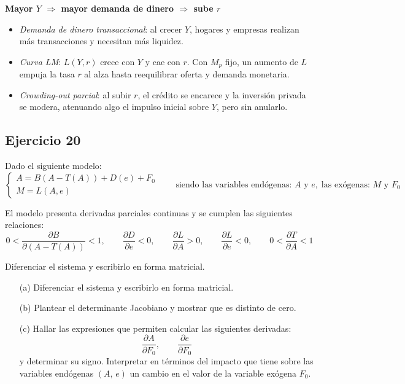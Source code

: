 \documentclass{article}
\begin{document}
\bigskip

\noindent
\textbf{\color{teal}Mayor \(Y\) \(\Rightarrow\) mayor demanda de dinero \(\Rightarrow\) sube \(r\)}

\begin{itemize}
  \item \emph{\color{teal}Demanda de dinero transaccional}: al crecer \(Y\), hogares y empresas realizan más transacciones y necesitan más liquidez.
  \item \emph{\color{teal}Curva LM}: \(L(Y,r)\) crece con \(Y\) y cae con \(r\). Con \(M_p\) fijo, un aumento de \(L\) empuja la tasa \(r\) al alza hasta reequilibrar oferta y demanda monetaria.
  \item \emph{\color{teal}Crowding-out parcial}: al subir \(r\), el crédito se encarece y la inversión privada se modera, atenuando algo el impulso inicial sobre \(Y\), pero sin anularlo.
\end{itemize}


\newpage
\subsection{Ejercicio 20}



Dado el siguiente modelo:
\[
\begin{cases}
A = B(A - T(A)) + D(e) + F_0\\[6pt]
M = L(A,e)
\end{cases}
\qquad \text{siendo las variables endógenas: } A \text{ y } e,\;
\text{las exógenas: } M \text{ y } F_0
\]

El modelo presenta derivadas parciales continuas y se cumplen las siguientes relaciones:
\[
0 < \frac{\partial B}{\partial (A - T(A))} < 1,
\qquad
\frac{\partial D}{\partial e} < 0,
\qquad
\frac{\partial L}{\partial A} > 0,
\qquad
\frac{\partial L}{\partial e} < 0,
\qquad
0 < \frac{\partial T}{\partial A} < 1
\]

\medskip

\noindent
Diferenciar el sistema y escribirlo en forma matricial.

\begin{itemize}
  \item[(a)] Diferenciar el sistema y escribirlo en forma matricial.
  \item[(b)] Plantear el determinante Jacobiano y mostrar que es distinto de cero.
  \item[(c)] Hallar las expresiones que permiten calcular las siguientes derivadas:
  \[
  \frac{\partial A}{\partial F_0},
  \qquad
  \frac{\partial e}{\partial F_0}
  \]
  y determinar su signo. Interpretar en términos del impacto que tiene sobre las variables endógenas \((A,\,e)\) un cambio en el valor de la variable exógena \(F_0\).
\end{itemize}
\end{document}

